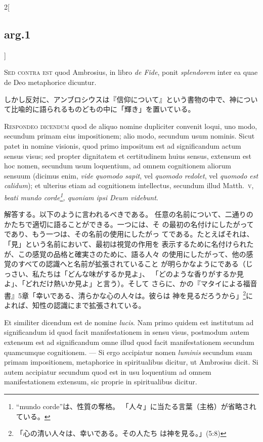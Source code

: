 \documentclass[paper=a4paper,fontsize=10pt,jafontsize=9pt,titlepage]{jlreq}
\begin{document}
\begin{paracol}{2}[\subsection{arg.1}]
\switchcolumn*[\subsection{s.c.}]

{\scshape Sed contra est} quod Ambrosius, in libro {\itshape de Fide},
ponit {\itshape splendorem} inter ea quae de Deo metaphorice dicuntur.

\switchcolumn

しかし反対に、アンブロシウスは『信仰について』という書物の中で、神につい
 て比喩的に語られるものどもの中に「輝き」を置いている。


{\scshape Respondeo dicendum} quod de aliquo nomine dupliciter convenit
loqui, uno modo, secundum primam eius impositionem; alio modo, secundum
usum nominis. Sicut patet in nomine visionis, quod primo impositum est
ad significandum actum sensus visus; sed propter dignitatem et
certitudinem huius sensus, extensum est hoc nomen, secundum usum
loquentium, ad omnem cognitionem aliorum sensuum (dicimus enim, {\itshape vide
quomodo sapit}, vel {\itshape quomodo redolet}, vel {\itshape quomodo est calidum}); et
ulterius etiam ad cognitionem intellectus, secundum illud Matth.~{\scshape v},
{\itshape beati mundo corde\footnote{ ``mundo corde''は、性質の奪格。
 「人々」に当たる言葉（主格）が省略されている。 }, quoniam ipsi Deum videbunt}.

\switchcolumn

解答する。以下のように言われるべきである。
任意の名前について、二通りのかたちで適切に語ることができる。一つには、そ
 の最初の名付けにしたがってであり、もう一つは、その名前の使用にしたがっ
 てである。たとえばそれは、「見」という名前において、最初は視覚の作用を
 表示するために名付けられたが、この感覚の品格と確実さのために、語る人々
 の使用にしたがって、他の感覚のすべての認識へと名前が拡張されていること
 が明らかなようにである（じっさい、私たちは「どんな味がするか見よ」、
 「どのような香りがするか見よ」、「どれだけ熱いか見よ」と言う）。そして
 さらに、かの『マタイによる福音書』5章「幸いである、清らかな心の人々は。彼らは
 神を見るだろうから」\footnote{「心の清い人々は、幸いである。その人たち
 は神を見る。」(5:8)}によれば、知性の認識にまで拡張されている。

\switchcolumn*

Et similiter dicendum est de nomine {\itshape lucis}. Nam primo quidem
est institutum ad significandum id quod facit manifestationem in sensu
visus, postmodum autem extensum est ad significandum omne illud quod
facit manifestationem secundum quamcumque cognitionem. --- Si ergo
accipiatur nomen {\itshape luminis} secundum suam primam impositionem,
metaphorice in spiritualibus dicitur, ut Ambrosius dicit. Si autem
accipiatur secundum quod est in usu loquentium ad omnem manifestationem
extensum, sic proprie in spiritualibus dicitur.


\end{paracol}
\end{document}
